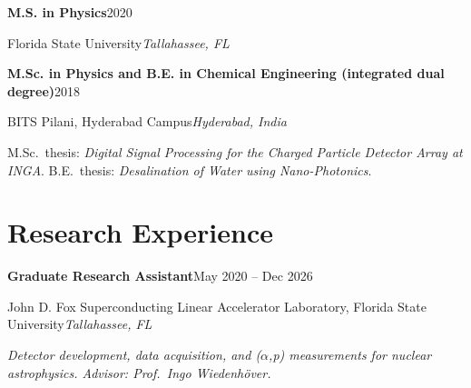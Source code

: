 \documentclass[10pt,letterpaper]{article}
\newcommand{\entry}[4]{%
  \par\addvspace{4pt}\noindent\textbf{#1}\hfill #2\par\nopagebreak
  \noindent #3\hfill\textit{#4}\par\nopagebreak}
\newcommand{\entrynote}[1]{\noindent\textit{#1}\par\nopagebreak}
\newcommand{\ap}{(\ensuremath{\alpha},p)}
\begin{document}
\entry{M.S. in Physics}{2020}{Florida State University}{Tallahassee, FL}

\entry{M.Sc. in Physics and B.E. in Chemical Engineering (integrated dual degree)}{2018}{BITS Pilani, Hyderabad Campus}{Hyderabad, India}
M.Sc.\ thesis: \textit{Digital Signal Processing for the Charged Particle Detector Array at INGA}.
B.E.\ thesis: \textit{Desalination of Water using Nano-Photonics}.

\section{Research Experience}
\entry{Graduate Research Assistant}{May 2020 -- Dec 2026}{John D. Fox Superconducting Linear Accelerator Laboratory, Florida State University}{Tallahassee, FL}
\entrynote{Detector development, data acquisition, and \ap{} measurements for nuclear astrophysics. Advisor: Prof.\ Ingo Wiedenhöver.}
\end{document}

